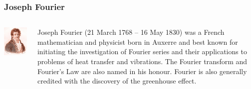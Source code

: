 \documentclass{beamer}
\begin{document}
\begin{frame}
\frametitle{Joseph Fourier}
\label{sec-2-2}
\begin{columns}
\begin{column}{0.3\textwidth}
\label{sec-2-2-1}

\includegraphics[width=.9\linewidth]{image/Fourier.jpg}
\end{column}
\begin{column}{0.7\textwidth}
\label{sec-2-2-2}

   Joseph Fourier (21 March 1768 – 16 May 1830) was a French mathematician and physicist born in Auxerre and best known for initiating the investigation of Fourier series and their applications to problems of heat transfer and vibrations. The Fourier transform and Fourier's Law are also named in his honour. Fourier is also generally credited with the discovery of the greenhouse effect.
\end{column}
\end{columns}
\end{frame}
\end{document}
